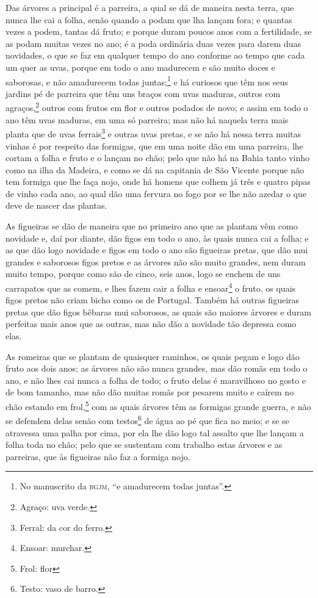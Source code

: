 \begin{linenumbers}
Das árvores a principal é a parreira, a qual se dá de maneira nesta terra, que nunca lhe
cai a folha, senão quando a podam que lha lançam fora; e quantas vezes a podem, tantas dá
fruto; e porque duram poucos anos com a fertilidade, se as podam muitas vezes no ano; é a
poda ordinária duas vezes para darem duas novidades, o que se faz em qualquer tempo do ano
conforme ao tempo que cada um quer as uvas, porque em todo o ano madurecem e são muito
doces e saborosas, e não amadurecem todas juntas;\footnote{ No manuscrito da
\textsc{bgjm}, ``e amadurecem todas juntas''.} e há curiosos que têm nos seus jardins pé
de parreira que têm uns braços com uvas maduras, outros com agraços,\footnote{ Agraço: uva
verde.} outros com frutos em flor e outros podados de novo; e assim em todo o
ano têm uvas maduras, em uma só parreira; mas não há naquela terra mais planta que de uvas
ferrais\footnote{ Ferral: da cor do ferro.} e outras uvas pretas, e se não há nessa terra
muitas vinhas é por respeito das formigas,
que em uma noite dão em uma parreira, lhe cortam a folha e fruto e o lançam no chão; pelo
que não há na Bahia tanto vinho como na ilha da Madeira, e como se dá na capitania de São
Vicente porque não tem formiga que lhe faça nojo, onde há homens que colhem já três e
quatro pipas de vinho cada ano, ao qual dão uma fervura no fogo por se lhe não azedar o
que deve de nascer das plantas.

As figueiras se dão de maneira que no primeiro ano que as plantam vêm como novidade e, daí
por diante, dão figos em todo o ano, às quais nunca cai a folha; e as que dão logo
novidade e figos em todo o ano são figueiras pretas, que dão mui grandes e saborosos figos
pretos e as árvores não são muito grandes, nem duram muito tempo, porque como são de
cinco, seis anos, logo se enchem de uns carrapatos que as comem, e lhes fazem cair a folha
e ensoar\footnote{ Ensoar: murchar.} o fruto, os quais figos pretos não criam
bicho como os de Portugal. Também há outras figueiras pretas que dão figos bêbaras mui
saborosos, as quais são maiores árvores e duram perfeitas mais anos que as outras, mas não
dão a novidade tão depressa como elas.

As romeiras que se plantam de quaisquer raminhos, os quais pegam e logo dão fruto aos dois
anos; as árvores não são nunca grandes, mas dão romãs em todo o ano, e não lhes cai nunca
a folha de todo; o fruto delas é maravilhoso no gosto e de bom tamanho, mas não dão muitas
romãs por pesarem muito e caírem no chão estando em frol,\footnote{Frol: flor} com as quais árvores têm as
formigas grande guerra, e não se defendem delas senão com testos\footnote{ Testo: vaso de
barro.} de água ao pé que fica no meio; e se se atravessa uma palha por cima, por ela lhe
dão logo tal assalto que lhe lançam a folha toda no chão; pelo que se sustentam com
trabalho estas árvores e as parreiras, que às figueiras não faz a formiga nojo.


\end{linenumbers}
